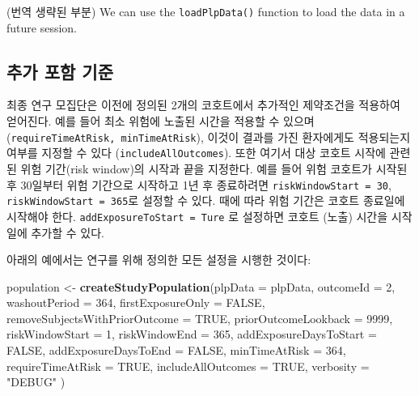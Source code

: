 \documentclass[11pt]{book}
\newenvironment{Shaded}{\begin{snugshade}}{\end{snugshade}}
\newcommand{\KeywordTok}[1]{\textcolor[rgb]{0.13,0.29,0.53}{\textbf{#1}}}
\newcommand{\DataTypeTok}[1]{\textcolor[rgb]{0.13,0.29,0.53}{#1}}
\newcommand{\DecValTok}[1]{\textcolor[rgb]{0.00,0.00,0.81}{#1}}
\newcommand{\StringTok}[1]{\textcolor[rgb]{0.31,0.60,0.02}{#1}}
\newcommand{\OtherTok}[1]{\textcolor[rgb]{0.56,0.35,0.01}{#1}}
\newcommand{\NormalTok}[1]{#1}
\theoremstyle{definition}
\theoremstyle{definition}
\theoremstyle{definition}
\theoremstyle{remark}
\begin{document}
(번역 생략된 부분) We can use the \texttt{loadPlpData()} function to
load the data in a future session.

\subsection{추가 포함 기준}\label{--}

최종 연구 모집단은 이전에 정의된 2개의 코호트에서 추가적인 제약조건을
적용하여 얻어진다. 예를 들어 최소 위험에 노출된 시간을 적용할 수 있으며
(\texttt{requireTimeAtRisk,\ minTimeAtRisk}), 이것이 결과를 가진
환자에게도 적용되는지 여부를 지정할 수 있다
(\texttt{includeAllOutcomes}). 또한 여기서 대상 코호트 시작에 관련된
위험 기간(risk window)의 시작과 끝을 지정한다. 예를 들어 위험 코호트가
시작된 후 30일부터 위험 기간으로 시작하고 1년 후 종료하려면
\texttt{riskWindowStart\ =\ 30}, \texttt{riskWindowStart\ =\ 365}로
설정할 수 있다. 때에 따라 위험 기간은 코호트 종료일에 시작해야 한다.
\texttt{addExposureToStart\ =\ Ture} 로 설정하면 코호트 (노출) 시간을
시작일에 추가할 수 있다.

아래의 예에서는 연구를 위해 정의한 모든 설정을 시행한 것이다:

\begin{Shaded}
\begin{Highlighting}[]
\NormalTok{population <-}\StringTok{ }\KeywordTok{createStudyPopulation}\NormalTok{(}\DataTypeTok{plpData =}\NormalTok{ plpData,}
                                    \DataTypeTok{outcomeId =} \DecValTok{2}\NormalTok{,}
                                    \DataTypeTok{washoutPeriod =} \DecValTok{364}\NormalTok{,}
                                    \DataTypeTok{firstExposureOnly =} \OtherTok{FALSE}\NormalTok{,}
                                    \DataTypeTok{removeSubjectsWithPriorOutcome =} \OtherTok{TRUE}\NormalTok{,}
                                    \DataTypeTok{priorOutcomeLookback =} \DecValTok{9999}\NormalTok{,}
                                    \DataTypeTok{riskWindowStart =} \DecValTok{1}\NormalTok{,}
                                    \DataTypeTok{riskWindowEnd =} \DecValTok{365}\NormalTok{,}
                                    \DataTypeTok{addExposureDaysToStart =} \OtherTok{FALSE}\NormalTok{,}
                                    \DataTypeTok{addExposureDaysToEnd =} \OtherTok{FALSE}\NormalTok{,}
                                    \DataTypeTok{minTimeAtRisk =} \DecValTok{364}\NormalTok{,}
                                    \DataTypeTok{requireTimeAtRisk =} \OtherTok{TRUE}\NormalTok{,}
                                    \DataTypeTok{includeAllOutcomes =} \OtherTok{TRUE}\NormalTok{,}
                                    \DataTypeTok{verbosity =} \StringTok{"DEBUG"}
\NormalTok{)}
\end{Highlighting}
\end{Shaded}
\end{document}
